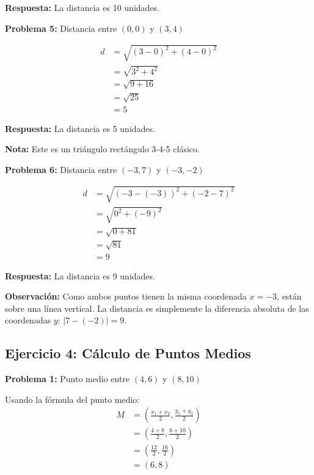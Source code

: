 \textbf{Respuesta:} La distancia es 10 unidades.

\medskip

\textbf{Problema 5:} Distancia entre $(0, 0)$ y $(3, 4)$

\begin{align*}
d &= \sqrt{(3 - 0)^2 + (4 - 0)^2} \\
  &= \sqrt{3^2 + 4^2} \\
  &= \sqrt{9 + 16} \\
  &= \sqrt{25} \\
  &= 5
\end{align*}

\textbf{Respuesta:} La distancia es 5 unidades.

\textbf{Nota:} Este es un triángulo rectángulo 3-4-5 clásico.

\medskip

\textbf{Problema 6:} Distancia entre $(-3, 7)$ y $(-3, -2)$

\begin{align*}
d &= \sqrt{(-3 - (-3))^2 + (-2 - 7)^2} \\
  &= \sqrt{0^2 + (-9)^2} \\
  &= \sqrt{0 + 81} \\
  &= \sqrt{81} \\
  &= 9
\end{align*}

\textbf{Respuesta:} La distancia es 9 unidades.

\textbf{Observación:} Como ambos puntos tienen la misma coordenada $x = -3$, están sobre una línea vertical. La distancia es simplemente la diferencia absoluta de las coordenadas $y$: $|7 - (-2)| = 9$.

\newpage

\subsection*{Ejercicio 4: Cálculo de Puntos Medios}

\textbf{Problema 1:} Punto medio entre $(4, 6)$ y $(8, 10)$

Usando la fórmula del punto medio:
\begin{align*}
M &= \left(\frac{x_1 + x_2}{2}, \frac{y_1 + y_2}{2}\right) \\
  &= \left(\frac{4 + 8}{2}, \frac{6 + 10}{2}\right) \\
  &= \left(\frac{12}{2}, \frac{16}{2}\right) \\
  &= (6, 8)
\end{align*}

